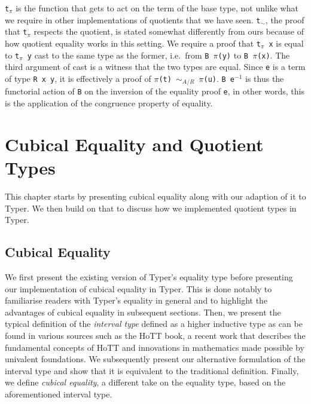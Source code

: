 \documentclass[12pt,twoside,maitrise]{dms}
\theoremstyle{definition}
\numberwithin{equation}{section}
\numberwithin{table}{chapter}
\numberwithin{figure}{chapter}
\newcommand\kw[1] {\textsf{#1}}
\newcommand\id[1] {\texttt{#1}}
\newcommand\fn[1] {\texttt{#1}}
\begin{document}
\id{t$_\pi$} is the function that gets to act on the term of the base type, not
unlike what we require in other implementations of quotients that we have seen.
\id{t$_\sim$}, the proof that \id{t$_\pi$} respects the quotient, is stated
somewhat differently from ours because of how quotient equality works in this
setting. We require a proof that \fn{t$_\pi$ x} is equal to \fn{t$_\pi$ y} cast
to the same type as the former, i.e.\ from \fn{B $\pi$(y)} to \fn{B $\pi$(x)}.
The third argument of \kw{cast} is a witness that the two types are equal. Since
\id{e} is a term of type \fn{R x y}, it is effectively a proof of \fn{$\pi$(t)
  $\sim_{A/R}$ $\pi$(u)}. \fn{B e$^{-1}$} is thus the functorial action of
\id{B} on the inversion of the equality proof \id{e}, in other words, this is
the application of the congruence property of equality.

\chapter{Cubical Equality and Quotient Types}

This chapter starts by presenting cubical equality along with our adaption of it
to Typer. We then build on that to discuss how we implemented quotient types in
Typer.

\section{Cubical Equality}\label{sec:cubical-equality}

We first present the existing version of Typer's equality type before presenting
our implementation of cubical equality in Typer. This is done notably to
familiarise readers with Typer's equality in general and to highlight the
advantages of cubical equality in subsequent sections. Then, we present the
typical definition of the \emph{interval type} defined as a higher inductive
type as can be found in various sources such as the HoTT
book\cite[Chap~6.3]{HoTTbook}, a recent work that describes the fundamental
concepts of HoTT and innovations in mathematics made possible by univalent
foundations. We subsequently present our alternative formulation of the interval
type and show that it is equivalent to the traditional definition. Finally, we
define \emph{cubical equality}, a different take on the equality type, based on
the aforementioned interval type.
\end{document}
